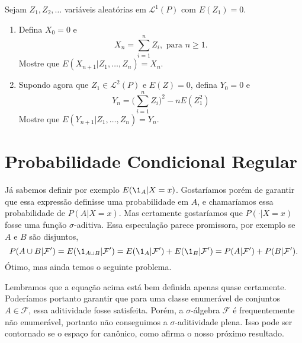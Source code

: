 \documentclass[../Notas_de_aula.tex]{subfiles}
\begin{document}
\begin{exercise}
  Sejam $Z_1, Z_2, \dots$ variáveis aleatórias \iid em $\mathcal{L}^1(P)$ com $E(Z_1) = 0$.
  \begin{enumerate}[\quad a)]
  \item Defina $X_0 = 0$ e
    \begin{equation}
      X_n = \sum_{i = 1}^n Z_i, \text{ para $n \geq 1$.}
    \end{equation}
    Mostre que $E(X_{n + 1} | Z_1, \dots, Z_n) = X_n$.
  \item Supondo agora que $Z_1 \in \mathcal{L}^2(P)$ e $E(Z) = 0$, defina $Y_0 = 0$ e
    \begin{equation}
      Y_n = \Big( \sum_{i = 1}^n Z_i \Big)^2 - n E(Z_1^2)
    \end{equation}
    Mostre que $E(Y_{n + 1} | Z_1, \dots, Z_n) = Y_n$.
  \end{enumerate}
\end{exercise}




\section{Probabilidade Condicional Regular}

Já sabemos definir por exemplo $E(\1_A|X = x)$.
Gostaríamos porém de garantir que essa expressão definisse uma probabilidade em $A$, e chamaríamos essa probabilidade de $P(A|X = x)$.
Mas certamente gostaríamos que $P(\cdot|X = x)$ fosse uma função $\sigma$-aditiva.
Essa especulação parece promissora, por exemplo se $A$ e $B$ são disjuntos,
\begin{equation*}
  P(A \cup B |\mathcal{F}') = E(\1_{A \cup B} | \mathcal{F}') = E(\1_A|\mathcal{F}') + E(\1_{B}|\mathcal{F}') = P(A|\mathcal{F}') + P(B|\mathcal{F}').
\end{equation*}
Ótimo, mas ainda temos o seguinte problema.

Lembramos que a equação acima está bem definida apenas quase certamente.
Poderíamos portanto garantir que para uma classe enumerável de conjuntos $A \in \mathcal{F}$, essa aditividade fosse satisfeita.
Porém, a $\sigma$-álgebra $\mathcal{F}$ é frequentemente não enumerável, portanto não conseguimos a $\sigma$-aditividade plena.
Isso pode ser contornado se o espaço for canônico, como afirma o nosso próximo resultado.
\end{document}
